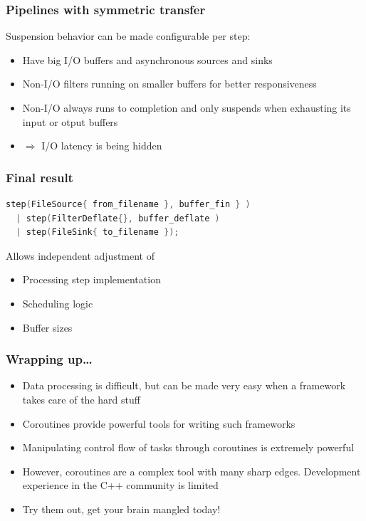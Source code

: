 \documentclass[aspectratio=169]{beamer}
\newif\iftransitions
\begin{document}
\begin{frame}
  \frametitle{Pipelines with symmetric transfer}
  
  Suspension behavior can be made configurable per step:
  \begin{itemize}
  \item Have big I/O buffers and asynchronous sources and sinks
  \item Non-I/O filters running on smaller buffers for better responsiveness
  \item Non-I/O always runs to completion and only suspends when exhausting its input or otput buffers
  \item $\Rightarrow$ I/O latency is being hidden
  \end{itemize}
\end{frame}


\begin{frame}[fragile]
  \frametitle{Final result}
  
  \begin{lstlisting}[language={C++}]
  step(FileSource{ from_filename }, buffer_fin } )
  | step(FilterDeflate{}, buffer_deflate )
  | step(FileSink{ to_filename });
  \end{lstlisting}
  
  \vspace{20pt}
  \iftransitions \pause \fi
  Allows independent adjustment of
  \begin{itemize}
  \item Processing step implementation
  \item Scheduling logic
  \item Buffer sizes
  \end{itemize}
\end{frame}

\begin{frame}
  \frametitle{Wrapping up\ldots}

  \begin{itemize}
  \item Data processing is difficult, but can be made very easy when a framework takes care of the hard stuff
  \item Coroutines provide powerful tools for writing such frameworks
  \item Manipulating control flow of tasks through coroutines is extremely powerful
  \item However, coroutines are a complex tool with many sharp edges. Development experience in the C++ community is limited
  \item Try them out, get your brain mangled today!
  \end{itemize}
\end{frame}
\end{document}
